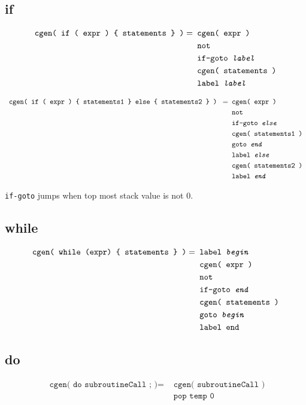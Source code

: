 \documentclass[a4paper]{book}
\begin{document}
\subsection*{if}
\begin{align*}
    \texttt{ cgen( if ( expr ) \{ statements \} )} = & \texttt{ cgen( expr )} \\
    & \texttt{ not } \\
    & \texttt{ if-goto \textit{label} } \\
    & \texttt{ cgen( statements ) } \\
    & \texttt{ label \textit{label} }
\end{align*}

\begin{align*}
    \texttt{ cgen( if ( expr ) \{ statements1 \} else \{ statements2 \} ) } = & \texttt{ cgen( expr ) } \\
    & \texttt{ not } \\
    & \texttt{ if-goto \textit{else}} \\
    & \texttt{ cgen( statements1 )} \\
    & \texttt{ goto \textit{end} } \\
    & \texttt{ label \textit{else} } \\
    & \texttt{ cgen( statements2 ) } \\
    & \texttt{ label \textit{end} }
\end{align*}

\texttt{if-goto} jumps when top most stack value is not 0.

\subsection*{while}
\begin{align*}
    \texttt{ cgen( while (expr) \{ statements \} )} = & \texttt{ label \textit{begin} } \\
    & \texttt{ cgen( expr )} \\
    & \texttt{ not } \\
    & \texttt{ if-goto \textit{end} } \\
    & \texttt{ cgen( statements ) } \\
    & \texttt{ goto \textit{begin} } \\
    & \texttt{ label \texttt{end} }
\end{align*}


\subsection*{do}
\begin{align*}
    \texttt{ cgen( do subroutineCall ; )} = & \texttt{ cgen( subroutineCall )} \\
    & \texttt{ pop temp 0 }
\end{align*}
\end{document}
